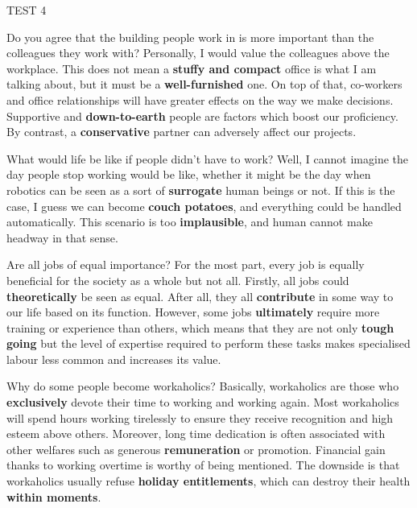 \begin{glossarymc}[Cambridge 12]
\begin{test}{TEST 4}
    \begin{qa}{Do you agree that the building people work in is more important than the colleagues they work with?}
    Personally, I would value the colleagues above the workplace. This does not mean a \textbf{stuffy and compact} office is what I am talking about, but it must be a \textbf{well-furnished} one. On top of that, co-workers and office relationships will have greater effects on the way we make decisions. Supportive and \textbf{down-to-earth} people are factors which boost our proficiency. By contrast, a \textbf{conservative} partner can adversely affect our projects.
    \end{qa}

    \begin{qa}{What would life be like if people didn’t have to work?}
    Well, I cannot imagine the day people stop working would be like, whether it might be the day when robotics can be seen as a sort of \textbf{surrogate} human beings or not. If this is the case, I guess we can become \textbf{couch potatoes}, and everything could be handled automatically. This scenario is too \textbf{implausible}, and human cannot make headway in that sense.
    \end{qa}

    \begin{qa}{Are all jobs of equal importance?}
    For the most part, every job is equally beneficial for the society as a whole but not all. Firstly, all jobs could \textbf{theoretically} be seen as equal. After all, they all \textbf{contribute} in some way to our life based on its function. However, some jobs \textbf{ultimately} require more training or experience than others, which means that they are not only \textbf{tough going} but the level of expertise required to perform these tasks makes specialised labour less common and increases its value.
    \end{qa}

    \begin{qa}{Why do some people become workaholics?}
    Basically, workaholics are those who \textbf{exclusively} devote their time to working and working again. Most workaholics will spend hours working tirelessly to ensure they receive recognition and high esteem above others. Moreover, long time dedication is often associated with other welfares such as generous \textbf{remuneration} or promotion. Financial gain thanks to working overtime is worthy of being mentioned. The downside is that workaholics usually refuse \textbf{holiday entitlements}, which can destroy their health \textbf{within moments}.
    \end{qa}


\end{test}
\end{glossarymc}

